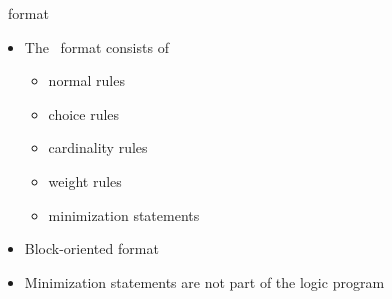 \begin{frame}{\smodels\ format}
  \begin{itemize}
  \item The \smodels\ format consists of
    \begin{itemize}
    \item normal rules
    \item choice rules
    \item cardinality rules
    \item weight rules
    \item minimization statements
    \end{itemize}
  \item Block-oriented format
  \item<2->  Minimization statements are not part of the logic program
  \end{itemize}
\end{frame}
